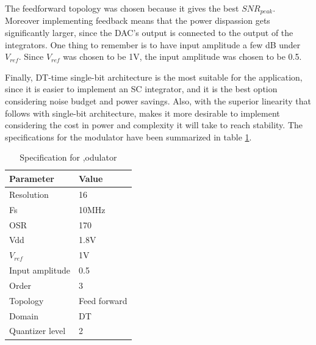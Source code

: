 The feedforward topology was chosen because it gives the best $SNR_{peak}$. Moreover implementing feedback means that the power dispassion gets significantly larger, since the DAC's output is connected to the output of the integrators. One thing to remember is to have input amplitude a few dB under $V_{ref}$. Since $V_{ref}$ was chosen to be 1V, the input amplitude was chosen to be 0.5.

Finally, DT-time single-bit architecture is the most suitable for the application, since it is easier to implement an SC integrator, and it is the best option considering noise budget and power savings. Also, with the superior linearity that follows with single-bit architecture, makes it more desirable to implement considering the cost in power and complexity it will take to reach stability. The specifications for the modulator have been 
summarized in table \ref{spec}.

\begin{table}[H]
\centering
\caption{Specification for ,odulator}
\label{spec}
\begin{tabular}{@{}ll@{}}
\toprule
Parameter       & Value        \\ \midrule
Resolution      & 16           \\
Fs              & 10MHz        \\
OSR             & 170          \\
Vdd             & 1.8V         \\
$V_{ref}$          & 1V           \\
Input amplitude & 0.5          \\
Order           & 3            \\
Topology        & Feed forward \\
Domain          & DT           \\
Quantizer level & 2            \\ \bottomrule
\end{tabular}
\end{table}